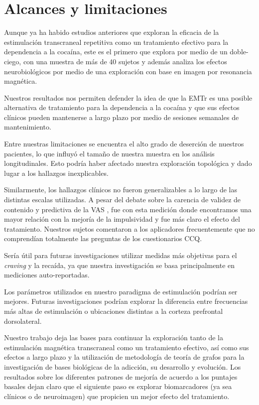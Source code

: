 \section{Alcances y limitaciones}
Aunque ya ha habido estudios anteriores que exploran la eficacia de la estimulación transcraneal repetitiva como un tratamiento efectivo para la dependencia a la cocaína, este es el primero que explora por medio de un doble-ciego, con una muestra de más de 40 sujetos y además analiza los efectos neurobiológicos por medio de una exploración con base en imagen por resonancia magnética. \par
Nuestros resultados nos permiten defender la idea de que la EMTr es una posible alternativa de tratamiento para la dependencia a la cocaína y que sus efectos clínicos pueden mantenerse a largo plazo por medio de sesiones semanales de mantenimiento. \par
Entre nuestras limitaciones se encuentra el alto grado de deserción de nuestros pacientes, lo que influyó el tamaño de nuestra muestra en los análisis longitudinales. Esto podría haber afectado nuestra exploración topológica y dado lugar a los hallazgos inexplicables. \par
Similarmente, los hallazgos clínicos no fueron generalizables a lo largo de las distintas escalas utilizadas. A pesar del debate sobre la carencia de validez de contenido y predictiva de la VAS \parencite{Ekhtiari2019}, fue con esta medición donde encontramos una mayor relación con la mejoría de la impulsividad y fue más claro el efecto del tratamiento. Nuestros sujetos comentaron a los aplicadores frecuentemente que no comprendían totalmente las preguntas de los cuestionarios CCQ. \par
Sería útil para futuras investigaciones utilizar medidas más objetivas para el \textit{craving} y la recaída, ya que nuestra investigación se basa principalmente en mediciones auto-reportadas. \par
Los parámetros utilizados en nuestro paradigma de estimulación podrían ser mejores. Futuras investigaciones podrían explorar la diferencia entre frecuencias más altas de estimulación o ubicaciones distintas a la corteza prefrontal dorsolateral.\par
Nuestro trabajo deja las bases para continuar la exploración tanto de la estimulación magnética transcraneal como un tratamiento efectivo, así como sus efectos a largo plazo y la utilización de metodología de teoría de grafos para la investigación de bases biológicas de la adicción, su desarrollo y evolución. Los resultados sobre los diferentes patrones de mejoría de acuerdo a los puntajes basales dejan claro que el siguiente paso es explorar biomarcadores (ya sea clínicos o de neuroimagen) que propicien un mejor efecto del tratamiento.
